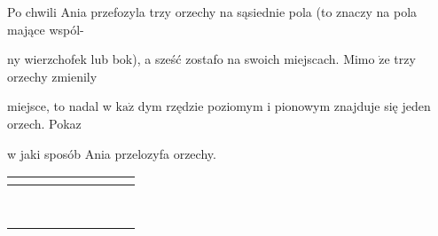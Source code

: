 \documentclass[a4paper,12pt]{article}
\begin{document}
Po chwili Ania przefozyla trzy orzechy na sąsiednie pola (to znaczy na pola mające wspól-

ny wierzchofek lub bok), a sześć zostafo na swoich miejscach. Mimo $\dot{\mathrm{z}}\mathrm{e}$ trzy orzechy zmienily

miejsce, to nadal w $\mathrm{k}\mathrm{a}\dot{\mathrm{z}}$ dym rzędzie poziomym i pionowym znajduje się jeden orzech. Pokaz

w jaki sposób Ania przelozyfa orzechy.
\begin{center}
\begin{tabular}{|l|l|l|l|l|l|l|l|l|}
\hline
\multicolumn{1}{|l|}{}&	\multicolumn{1}{|l|}{}&	\multicolumn{1}{|l|}{}&	\multicolumn{1}{|l|}{}&	\multicolumn{1}{|l|}{}&	\multicolumn{1}{|l|}{}&	\multicolumn{1}{|l|}{}&	\multicolumn{1}{|l|}{}&	\multicolumn{1}{|l|}{}	\\
\hline
\multicolumn{1}{|l|}{}&	\multicolumn{1}{|l|}{}&	\multicolumn{1}{|l|}{}&	\multicolumn{1}{|l|}{}&	\multicolumn{1}{|l|}{}&	\multicolumn{1}{|l|}{}&	\multicolumn{1}{|l|}{}&	\multicolumn{1}{|l|}{}&	\multicolumn{1}{|l|}{}	\\
\hline
\multicolumn{1}{|l|}{}&	\multicolumn{1}{|l|}{}&	\multicolumn{1}{|l|}{}&	\multicolumn{1}{|l|}{}&	\multicolumn{1}{|l|}{}&	\multicolumn{1}{|l|}{}&	\multicolumn{1}{|l|}{}&	\multicolumn{1}{|l|}{}&	\multicolumn{1}{|l|}{}	\\
\hline
\multicolumn{1}{|l|}{}&	\multicolumn{1}{|l|}{}&	\multicolumn{1}{|l|}{}&	\multicolumn{1}{|l|}{}&	\multicolumn{1}{|l|}{}&	\multicolumn{1}{|l|}{}&	\multicolumn{1}{|l|}{}&	\multicolumn{1}{|l|}{}&	\multicolumn{1}{|l|}{}	\\
\hline
\multicolumn{1}{|l|}{}&	\multicolumn{1}{|l|}{}&	\multicolumn{1}{|l|}{}&	\multicolumn{1}{|l|}{}&	\multicolumn{1}{|l|}{}&	\multicolumn{1}{|l|}{}&	\multicolumn{1}{|l|}{}&	\multicolumn{1}{|l|}{}&	\multicolumn{1}{|l|}{}	\\
\hline
\multicolumn{1}{|l|}{}&	\multicolumn{1}{|l|}{}&	\multicolumn{1}{|l|}{}&	\multicolumn{1}{|l|}{}&	\multicolumn{1}{|l|}{}&	\multicolumn{1}{|l|}{}&	\multicolumn{1}{|l|}{}&	\multicolumn{1}{|l|}{}&	\multicolumn{1}{|l|}{}	\\
\hline
\multicolumn{1}{|l|}{}&	\multicolumn{1}{|l|}{}&	\multicolumn{1}{|l|}{}&	\multicolumn{1}{|l|}{}&	\multicolumn{1}{|l|}{}&	\multicolumn{1}{|l|}{}&	\multicolumn{1}{|l|}{}&	\multicolumn{1}{|l|}{}&	\multicolumn{1}{|l|}{}	\\
\hline
\multicolumn{1}{|l|}{}&	\multicolumn{1}{|l|}{}&	\multicolumn{1}{|l|}{}&	\multicolumn{1}{|l|}{}&	\multicolumn{1}{|l|}{}&	\multicolumn{1}{|l|}{}&	\multicolumn{1}{|l|}{}&	\multicolumn{1}{|l|}{}&	\multicolumn{1}{|l|}{}	\\
\hline
\multicolumn{1}{|l|}{}&	\multicolumn{1}{|l|}{}&	\multicolumn{1}{|l|}{}&	\multicolumn{1}{|l|}{}&	\multicolumn{1}{|l|}{}&	\multicolumn{1}{|l|}{}&	\multicolumn{1}{|l|}{}&	\multicolumn{1}{|l|}{}&	\multicolumn{1}{|l|}{}	\\
\hline
\end{tabular}
\end{center}
\end{document}
